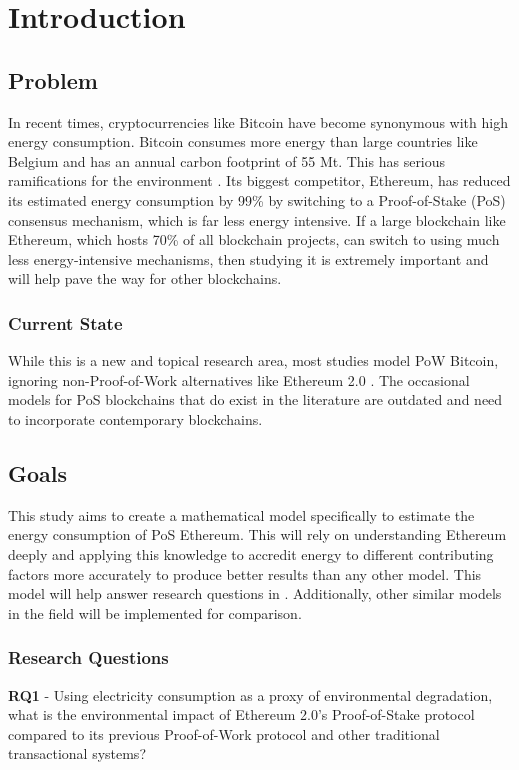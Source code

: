 \chapter{Introduction}

\section{Problem}
In recent times, cryptocurrencies like Bitcoin have become synonymous with high energy consumption. Bitcoin consumes more energy than large countries like Belgium and has an annual carbon footprint of 55 Mt. This has serious ramifications for the environment \cite{BitcoinDigiconomist}. Its biggest competitor, Ethereum, has reduced its estimated energy consumption by 99\% by switching to a Proof-of-Stake (PoS) consensus mechanism, which is far less energy intensive. If a large blockchain like Ethereum, which hosts 70\% of all blockchain projects, can switch to using much less energy-intensive mechanisms, then studying it is extremely important and will help pave the way for other blockchains. 

\subsection{Current State}
While this is a new and topical research area, most studies model PoW Bitcoin, ignoring non-Proof-of-Work alternatives like Ethereum 2.0 \cite{Lei2021BestRecommendations}. The occasional models for PoS blockchains that do exist in the literature are outdated and need to incorporate contemporary blockchains. 

\section{Goals}
This study aims to create a mathematical model specifically to estimate the energy consumption of PoS Ethereum. This will rely on understanding Ethereum deeply and applying this knowledge to accredit energy to different contributing factors more accurately to produce better results than any other model. This model will help answer research questions in . Additionally, other similar models in the field will be implemented for comparison.

\subsection{Research Questions}
\label{ResearchQuestions}
\textbf{RQ1} - Using electricity consumption as a proxy of environmental degradation, what is the environmental impact of Ethereum 2.0's Proof-of-Stake protocol compared to its previous Proof-of-Work protocol and other traditional transactional systems?

